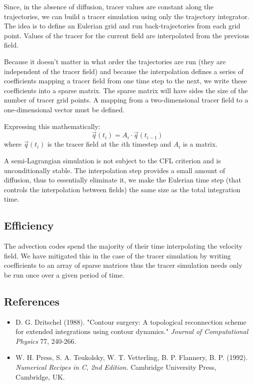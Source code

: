Since, in the absence of diffusion, tracer values are constant
along the trajectories, we can build a tracer simulation
using only the trajectory integrator.
The idea is to define an Eulerian grid and 
run back-trajectories from each grid point.
Values of the tracer for the current field are
interpolated from the previous field.

Because it doesn't matter in what order the trajectories 
are run (they are independent of the tracer field)
and because the interpolation defines a series of coefficients
mapping a tracer field from one time step to the next,
we write these coefficients into a sparse matrix.
The sparse matrix will have sides the size of
the number of tracer grid points.
A mapping from a two-dimensional tracer field
to a one-dimensional vector must be defined.

Expressing this mathematically:
\begin{equation}
\vec q (t_i) = A_{i} \cdot \vec q(t_{i-1})
\end{equation}
where $\vec q(t_i)$ is the tracer field at the $i$th
timestep and $A_i$ is a matrix.

A semi-Lagrangian simulation is not subject to the CFL criterion
and is unconditionally stable.
 The interpolation step provides a small amount of diffusion,
thus to essentially eliminate it, we make the Eulerian time step
(that controls the interpolation between fields) the same
size as the total integration time.

\subsection{Efficiency}

The advection codes spend the majority of their time
interpolating the velocity field.
We have mitigated this in the case of the tracer simulation
by writing coefficients to an array of sparse matrices
thus the tracer simulation needs only be run once over a given
period of time.

\subsection*{References}

\begin{itemize}

\item{D. G. Dritschel (1988). "Contour surgery: A topological reconnection scheme
for extended integrations using contour dynamics." {\it Journal of
Computational Physics} 77, 240-266.}
\item{W. H. Press, S. A. Teukolsky, W. T. Vetterling, B. P. Flannery, B. P. (1992).
{\it Numerical Recipes in C, 2nd Edition.} Cambridge University Press,
Cambridge, UK.}
\end{itemize}

%



